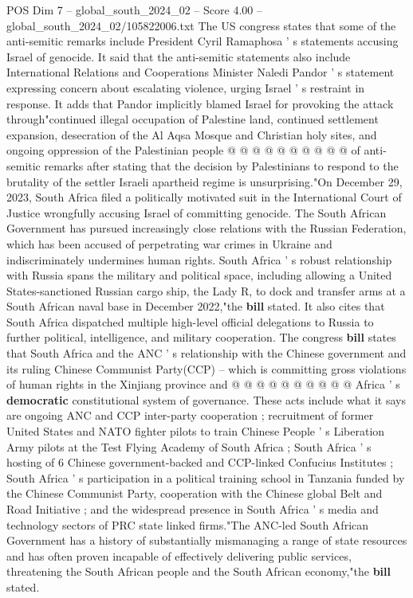 \begin{textsample}{POS Dim 7 – global\_south\_2024\_02 – Score 4.00 – global\_south\_2024\_02/105822006.txt}
The US congress states that some of the anti-semitic remarks include President Cyril Ramaphosa ' s statements accusing Israel of genocide.
It said that the anti-semitic statements also include International Relations and Cooperations Minister Naledi Pandor ' s statement expressing concern about escalating violence, urging Israel ' s restraint in response.
It adds that Pandor implicitly blamed Israel for provoking the attack through"continued illegal occupation of Palestine land, continued settlement expansion, desecration of the Al Aqsa Mosque and Christian holy sites, and ongoing oppression of the Palestinian people @ @ @ @ @ @ @ @ @ @ of anti-semitic remarks after stating that the decision by Palestinians to respond to the brutality of the settler Israeli apartheid regime is unsurprising."On December 29, 2023, South Africa filed a politically motivated suit in the International Court of Justice wrongfully accusing Israel of committing genocide.
The South African Government has pursued increasingly close relations with the Russian Federation, which has been accused of perpetrating war crimes in Ukraine and indiscriminately undermines human rights.
South Africa ' s robust relationship with Russia spans the military and political space, including allowing a United States-sanctioned Russian cargo ship, the Lady R, to dock and transfer arms at a South African naval base in December 2022,"the \textbf{bill} stated.
It also cites that South Africa dispatched multiple high-level official delegations to Russia to further political, intelligence, and military cooperation.
The congress \textbf{bill} states that South Africa and the ANC ' s relationship with the Chinese government and its ruling Chinese Communist Party(CCP) -- which is committing gross violations of human rights in the Xinjiang province and @ @ @ @ @ @ @ @ @ @ Africa ' s \textbf{democratic} constitutional system of governance.
These acts include what it says are ongoing ANC and CCP inter-party cooperation ; recruitment of former United States and NATO fighter pilots to train Chinese People ' s Liberation Army pilots at the Test Flying Academy of South Africa ; South Africa ' s hosting of 6 Chinese government-backed and CCP-linked Confucius Institutes ; South Africa ' s participation in a political training school in Tanzania funded by the Chinese Communist Party, cooperation with the Chinese global Belt and Road Initiative ; and the widespread presence in South Africa ' s media and technology sectors of PRC state linked firms."The ANC-led South African Government has a history of substantially mismanaging a range of state resources and has often proven incapable of effectively delivering public services, threatening the South African people and the South African economy,"the \textbf{bill} stated.

\end{textsample}

